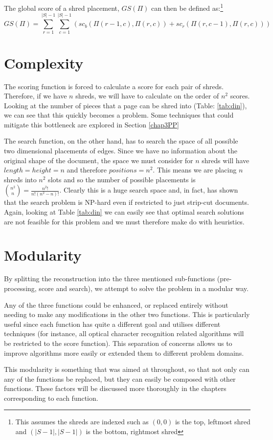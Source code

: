 The global score of a shred placement, $GS(\Pi)$ can then be defined as:\footnote{This assumes the shreds are indexed such as $(0,0)$ is the top, leftmost shred and $(|S-1|,|S-1|)$ is the bottom, rightmost shred} \[GS(\Pi) = \sum_{r=1}^{|S|-1} \sum_{c=1}^{|S|-1} (sc_b(\Pi(r-1,c),\Pi(r,c)) + sc_r(\Pi(r,c-1),\Pi(r,c)))  \]
 
\section{Complexity}
The scoring function is forced to calculate a score for each pair of shreds. Therefore, if we have $n$ shreds, we will have to calculate on the order of $n^2$ scores. Looking at the number of pieces that a page can be shred into (Table: \ref{tab:din}), we can see that this quickly becomes a problem. Some techniques that could mitigate this bottleneck are explored in Section \ref{chap3PP}

The search function, on the other hand, has to search the space of all possible two dimensional placements of edges. Since we have no information about the original shape of the document, the space we must consider for $n$ shreds will have $length = height = n$ and therefore $positions = n^2$. This means we are placing $n$ shreds into $n^2$ slots and so the number of possible placements is $\displaystyle {n^2 \choose n} = \frac{n^2!}{n!(n^2-n)!} $. Clearly this is a huge search space and, in fact, \cite{P1} has shown that the search problem is NP-hard even if restricted to just strip-cut documents. Again, looking at Table \ref{tab:din} we can easily see that optimal search solutions are not feasible for this problem and we must therefore make do with heuristics.

\section{Modularity}
By splitting the reconstruction into the three mentioned sub-functions (pre-processing, score and search), we attempt to solve the problem in a modular way.

Any of the three functions could be enhanced, or replaced entirely without needing to make any modifications in the other two functions. This is particularly useful since each function has quite a different goal and utilises different techniques (for instance, all optical character recognition related algorithms will be restricted to the score function). This separation of concerns allows us to improve algorithms more easily or extended them to different problem domains. 

This modularity is something that was aimed at throughout, so that not only can any of the functions be replaced, but they can easily be composed with other functions. These factors will be discussed more thoroughly in the chapters corresponding to each function.
